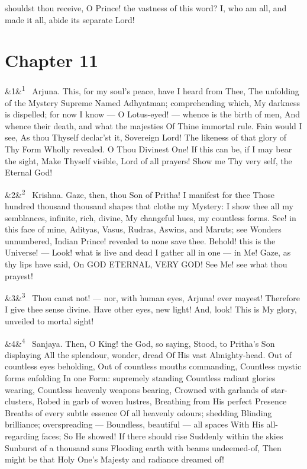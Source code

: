 \documentclass[12pt]{article}
\newcommand{\para}[1][]{\par\noindent\ifx&#1&\else\textsuperscript{\footnotesize #1}~\fi}
\begin{document}
shouldst thou receive, O Prince! the vastness of this word? I, who am all, and made it all, abide its separate Lord!

\section*{Chapter 11}

\para[1] Arjuna. This, for my soul's peace, have I heard from Thee, The unfolding of the Mystery Supreme Named Adhyatman; comprehending which, My darkness is dispelled; for now I know --- O Lotus-eyed! --- whence is the birth of men, And whence their death, and what the majesties Of Thine immortal rule. Fain would I see, As thou Thyself declar'st it, Sovereign Lord! The likeness of that glory of Thy Form Wholly revealed. O Thou Divinest One! If this can be, if I may bear the sight, Make Thyself visible, Lord of all prayers! Show me Thy very self, the Eternal God!

\para[2] Krishna. Gaze, then, thou Son of Pritha! I manifest for thee Those hundred thousand thousand shapes that clothe my Mystery: I show thee all my semblances, infinite, rich, divine, My changeful hues, my countless forms. See! in this face of mine, Adityas, Vasus, Rudras, Aswins, and Maruts; see Wonders unnumbered, Indian Prince! revealed to none save thee. Behold! this is the Universe! --- Look! what is live and dead I gather all in one --- in Me! Gaze, as thy lips have said, On GOD ETERNAL, VERY GOD! See Me! see what thou prayest!

\para[3] Thou canst not! --- nor, with human eyes, Arjuna! ever mayest! Therefore I give thee sense divine. Have other eyes, new light! And, look! This is My glory, unveiled to mortal sight!

\para[4] Sanjaya. Then, O King! the God, so saying, Stood, to Pritha's Son displaying All the splendour, wonder, dread Of His vast Almighty-head. Out of countless eyes beholding, Out of countless mouths commanding, Countless mystic forms enfolding In one Form: supremely standing Countless radiant glories wearing, Countless heavenly weapons bearing, Crowned with garlands of star-clusters, Robed in garb of woven lustres, Breathing from His perfect Presence Breaths of every subtle essence Of all heavenly odours; shedding Blinding brilliance; overspreading --- Boundless, beautiful --- all spaces With His all-regarding faces; So He showed! If there should rise Suddenly within the skies Sunburst of a thousand suns Flooding earth with beams undeemed-of, Then might be that Holy One's Majesty and radiance dreamed of!
\end{document}
